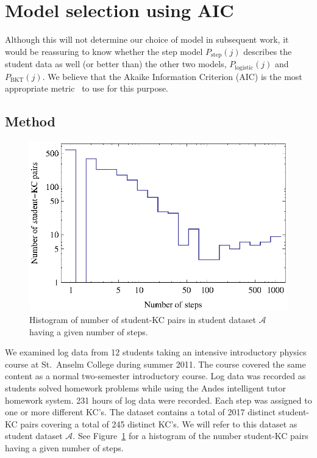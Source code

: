 \documentclass{acmlarge-edm}
\begin{document}
\section{Model selection using AIC}
\label{model-selection}

Although this will not determine our choice of model in subsequent
work, it would be reassuring to know whether the step model 
$P_\mathrm{step}(j)$
describes the student data as well (or better than) the
other two models, $P_\mathrm{logistic}(j)$ and $P_\mathrm{BKT}(j)$.  
We believe that the Akaike Information 
Criterion (AIC) is the most appropriate metric~\cite{akaike_new_1974,burnham_model_2002}
to use for this purpose.

\subsection{Method}


\begin{figure}
  \centering \includegraphics{student-kc-length-histogram.eps}
  \caption{Histogram of number of student-KC pairs in student 
    dataset $\mathcal{A}$ having a given number of steps.}
    \label{student-length-histogram}
\end{figure}

We examined log data from 12 students taking an intensive 
introductory physics course at St.\ Anselm College during
summer 2011.  The course
covered the same content as a normal two-semester introductory
course.  Log data was recorded as students solved homework 
problems while using the Andes intelligent tutor homework system.
231 hours of log data were recorded.
Each step was assigned to one or more different KC's.  
The dataset contains a total of 2017 distinct
student-KC pairs covering a total of 245 distinct KC's.
We will refer to this dataset as student dataset $\mathcal{A}$.
See Figure~\ref{student-length-histogram} for a histogram
of the number student-KC pairs having a given number of steps.
\end{document}
